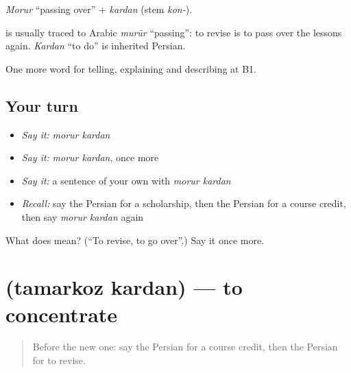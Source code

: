 \emph{Morur} \textquotedblleft{}passing over\textquotedblright{} + \emph{kardan} (stem \emph{kon-}).

\begin{cousinweb}
\textbf{} is usually traced to Arabic \emph{murūr} \textquotedblleft{}passing\textquotedblright{}: to revise is to pass over the lessons again. \emph{Kardan} \textquotedblleft{}to do\textquotedblright{} is inherited Persian.
\end{cousinweb}

\begin{grammarlens}[title={What you've built}]
One more word for telling, explaining and describing at B1.
\end{grammarlens}

\subsection*{Your turn}
\begin{itemize}
\raggedright
  \item \emph{Say it:} \emph{morur kardan}
  \item \emph{Say it:} \emph{morur kardan}, once more
  \item \emph{Say it:} a sentence of your own with \emph{morur kardan}
  \item \emph{Recall:} say the Persian for a scholarship, then the Persian for a course credit, then say \emph{morur kardan} again
\end{itemize}

\begin{tcolorbox}[breakable,colback=teal!4,colframe=teal!35!black,title={Before you move on}]
What does   mean? (\textquotedblleft{}To revise, to go over\textquotedblright{}.) Say it once more.
\end{tcolorbox}
\section[\texorpdfstring{\fa{تمرکز} \fa{کردن} (tamarkoz kardan)}{تمرکز کردن (tamarkoz kardan)}]{  (tamarkoz kardan) — to concentrate}

\label{lesson:FA-C401-tamarkoz-kardan}



\begin{quote}
Before the new one: say the Persian for a course credit, then the Persian for to revise.
\end{quote}

